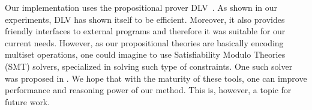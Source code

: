 Our implementation uses the propositional prover
DLV~\cite{leone06tcl}. As shown in our experiments, DLV has shown itself
to be efficient. Moreover, it also provides friendly interfaces to external
programs and therefore it was suitable for our current needs. However, as
our propositional theories are basically encoding multiset operations, one
could imagine to use Satisfiability Modulo Theories (SMT) solvers,
specialized in solving such type of constraints. One such solver was
proposed in \cite{piskac10ijcar}. We hope that with the maturity of these
tools, one can improve performance and reasoning power of our method. This
is, however, a topic for future work.


